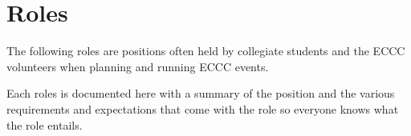 \setchapterpreamble[u]{\margintoc}
\chapter{Roles}

The following roles are positions often held by collegiate students and the ECCC volunteers
when planning and running ECCC events.

Each roles is documented here with a summary of the position
and the various requirements and expectations that come with the role
so everyone knows what the role entails.


